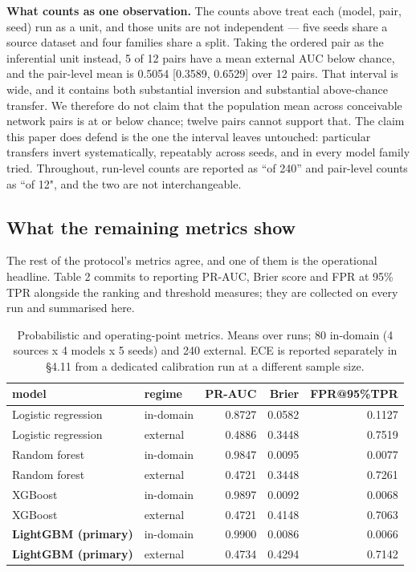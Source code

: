\documentclass[11pt,a4paper]{article}
\begin{document}
\textbf{What counts as one observation.} The counts above treat each (model, pair, seed) run as a unit, and those units are not independent --- five seeds share a source dataset and four families share a split. Taking the ordered pair as the inferential unit instead, 5 of 12 pairs have a mean external AUC below chance, and the pair-level mean is 0.5054 [0.3589, 0.6529] over 12 pairs. That interval is wide, and it contains both substantial inversion and substantial above-chance transfer. We therefore do not claim that the population mean across conceivable network pairs is at or below chance; twelve pairs cannot support that. The claim this paper does defend is the one the interval leaves untouched: particular transfers invert systematically, repeatably across seeds, and in every model family tried. Throughout, run-level counts are reported as ``of 240'' and pair-level counts as ``of 12", and the two are not interchangeable.

\subsection{What the remaining metrics show}

The rest of the protocol's metrics agree, and one of them is the operational headline. Table 2 commits to reporting PR-AUC, Brier score and FPR at 95\% TPR alongside the ranking and threshold measures; they are collected on every run and summarised here.

\begin{table}[htbp]\centering\small
\caption{Probabilistic and operating-point metrics. Means over runs; 80 in-domain (4 sources x 4 models x 5 seeds) and 240 external. ECE is reported separately in §4.11 from a dedicated calibration run at a different sample size.}
\begin{tabular}{llrrr}
\toprule
model & regime & PR-AUC & Brier & FPR@95\%TPR \\
\midrule
Logistic regression & in-domain & 0.8727 & 0.0582 & 0.1127 \\
Logistic regression & external & 0.4886 & 0.3448 & 0.7519 \\
Random forest & in-domain & 0.9847 & 0.0095 & 0.0077 \\
Random forest & external & 0.4721 & 0.3448 & 0.7261 \\
XGBoost & in-domain & 0.9897 & 0.0092 & 0.0068 \\
XGBoost & external & 0.4721 & 0.4148 & 0.7063 \\
\textbf{LightGBM (primary)} & in-domain & 0.9900 & 0.0086 & 0.0066 \\
\textbf{LightGBM (primary)} & external & 0.4734 & 0.4294 & 0.7142 \\
\bottomrule
\end{tabular}
\end{table}
\end{document}
